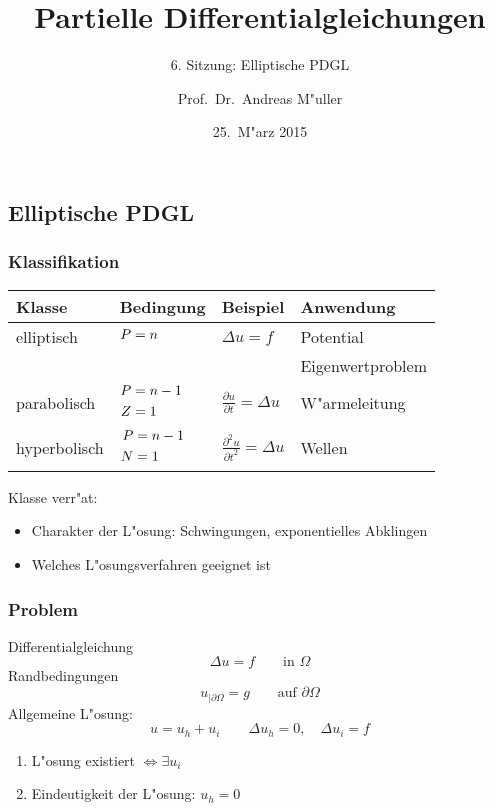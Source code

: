 \documentclass{beamer}
\title[]{Partielle Differentialgleichungen}
\subtitle{6. Sitzung: Elliptische PDGL}
\date[25.~M"arz 2015]{25.~M"arz 2015}
\author{Prof.~Dr.~Andreas M"uller}
\begin{document}
\begin{frame}
\section{Elliptische PDGL}
\titlepage
\end{frame}

\begin{frame}
\frametitle{Klassifikation}

\begin{center}
\begin{tabular}{llll}
Klasse&Bedingung&Beispiel&Anwendung\\
\hline
elliptisch &$\begin{aligned}P&=n\mathstrut\end{aligned}$
	&$\displaystyle \Delta u=f                                $
		&Potential\\
&	&	&Eigenwertproblem\\
\hline
parabolisch&%
$\begin{aligned}P&=n-1\mathstrut\\Z&=1\mathstrut\end{aligned}$
	&$\displaystyle \frac{\partial u}{\partial t}=\Delta u    $
		&W"armeleitung\\
\hline
hyperbolisch&%
$\begin{aligned}P&=n-1\mathstrut\\N&=1\mathstrut\end{aligned}$
	&$\displaystyle \frac{\partial^2 u}{\partial t^2}=\Delta u$
		&Wellen\\
\hline
\end{tabular}
\end{center}

Klasse verr"at:
\begin{itemize}
\item Charakter der L"osung: Schwingungen, exponentielles Abklingen
\item Welches L"osungsverfahren geeignet ist
\end{itemize}

\end{frame}

\begin{frame}
\frametitle{Problem}
Differentialgleichung
\[
\Delta u=f\qquad\text{in $\Omega$}
\]
Randbedingungen
\[
u_{|\partial \Omega}=g\qquad\text{auf $\partial\Omega$}
\]
\pause
Allgemeine L"osung:
\[
u=u_h+u_i\qquad\Delta u_h=0,\quad \Delta u_i=f
\]
\begin{enumerate}
\item L"osung existiert $\Leftrightarrow \exists u_i$  
\item Eindeutigkeit der L"osung: $u_h=0$
\end{enumerate}
\end{frame}
\end{document}
